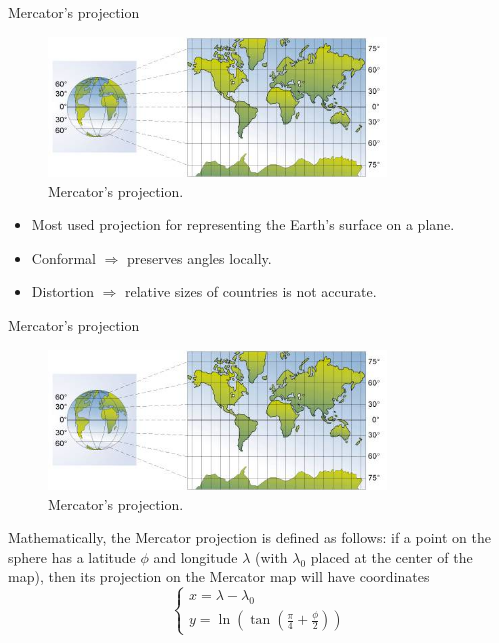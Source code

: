 \documentclass[10pt]{beamer}
\begin{document}
\begin{frame}{Mercator's projection}
  \begin{figure}[H]
    \centering
    \includegraphics[width=0.8\textwidth]{images/mercator.jpg}
    \caption{Mercator's projection\cite{img:mercator}.}
\end{figure}

\begin{itemize}
  \item Most used projection for representing the Earth's surface on a plane.
  \item Conformal $\Longrightarrow$ preserves angles locally.
  \item Distortion $\Longrightarrow$ relative sizes of countries is not accurate.
\end{itemize}
\end{frame}

\begin{frame}{Mercator's projection}
  \begin{figure}[H]
    \centering
    \includegraphics[width=0.8\textwidth]{images/mercator.jpg}
    \caption{Mercator's projection\cite{img:mercator}.}
\end{figure}
Mathematically, the Mercator projection is defined as follows: if a point on 
the sphere has a latitude $\phi$ and longitude $\lambda$ (with $\lambda_{0}$ 
placed at the center of the map), then its projection on the Mercator map will 
have coordinates 
\begin{equation}
  \left\{
  \begin{array}{l}
      x =  \lambda - \lambda_{0} \\
      y =  \ln(\tan(\frac{\pi}{4} + \frac{\phi}{2}))
  \end{array}
  \right.
\end{equation}
\end{frame}
\end{document}
